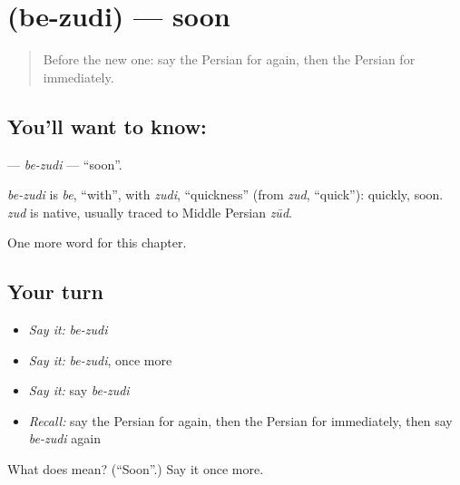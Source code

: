 \section[\texorpdfstring{\fa{به} \fa{زودی} (be-zudi)}{به زودی (be-zudi)}]{  (be-zudi) — soon}

\label{lesson:FA-C192-be-zudi}



\begin{quote}
Before the new one: say the Persian for again, then the Persian for immediately.
\end{quote}

\subsection*{You'll want to know:  }
\textbf{ } — \emph{be-zudi} — \textquotedblleft{}soon\textquotedblright{}.

\begin{cousinweb}
\emph{be-zudi} is \emph{be}, \textquotedblleft{}with\textquotedblright{}, with \emph{zudi}, \textquotedblleft{}quickness\textquotedblright{} (from \emph{zud}, \textquotedblleft{}quick\textquotedblright{}): quickly, soon. \emph{zud} is native, usually traced to Middle Persian \emph{zūd}.
\end{cousinweb}

\begin{grammarlens}[title={What you've built}]
One more word for this chapter.
\end{grammarlens}

\subsection*{Your turn}
\begin{itemize}
\raggedright
  \item \emph{Say it:} \emph{be-zudi}
  \item \emph{Say it:} \emph{be-zudi}, once more
  \item \emph{Say it:} say \emph{be-zudi}
  \item \emph{Recall:} say the Persian for again, then the Persian for immediately, then say \emph{be-zudi} again
\end{itemize}

\begin{tcolorbox}[breakable,colback=teal!4,colframe=teal!35!black,title={Before you move on}]
What does   mean? (\textquotedblleft{}Soon\textquotedblright{}.) Say it once more.
\end{tcolorbox}
